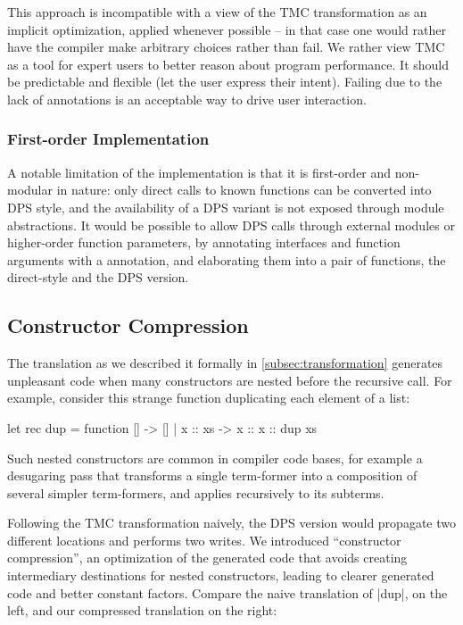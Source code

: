 This approach is incompatible with a view of the TMC
transformation as an implicit optimization, applied whenever
possible -- in that case one would rather have the compiler make
arbitrary choices rather than fail. We rather view TMC as a tool for
expert users to better reason about program performance. It should be
predictable and flexible (let the user express
their intent). Failing due to the lack of annotations is an acceptable way
to drive user interaction.

\subsubsection{First-order Implementation}\label{subsubsec:first-order}
A notable limitation of the \OCaml implementation is that it is first-order and non-modular in nature: only direct calls to known functions can be converted into DPS style, and the availability of a DPS variant is not exposed through module abstractions.
It would be possible to allow DPS calls through external modules or higher-order function parameters, by annotating interfaces and function arguments with a  annotation, and elaborating them into a pair of functions, the direct-style and the DPS version.

\subsection{Constructor Compression} \label{subsec:constructor-compression} The translation as we described it formally in \cref{subsec:transformation} generates unpleasant code when many constructors are nested before the recursive call. For example, consider this strange function duplicating each element of a list:
\begin{Ocaml}
let rec dup = function [] -> [] | x :: xs -> x :: x :: dup xs
\end{Ocaml}

Such nested constructors are common in compiler code bases, for
example a desugaring pass that transforms a single term-former into
a composition of several simpler term-formers, and applies recursively to
its subterms.

Following the TMC transformation naively, the DPS version would propagate two different locations and performs two writes. We introduced ``constructor compression'', an optimization of the generated code that avoids creating intermediary destinations for nested constructors, leading to clearer generated code and better constant factors. Compare the naive translation of \ocaml|dup|, on the left, and our compressed translation on the right:

